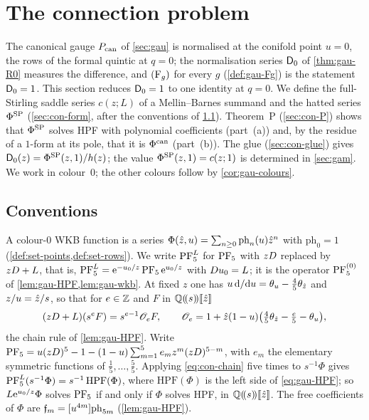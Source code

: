 
\section{The connection problem}
\label{sec:con}

The canonical gauge $P_{\mathrm{can}}$ of \cref{sec:gau} is normalised at the conifold point $u=0$, the rows of the formal quintic at $q=0$; the normalisation series $\mathsf{D}_0$ of \cref{thm:gau-R0} measures the difference, and $(\mathrm{F}_{g})$ for every $g$ (\cref{def:gau-Fg}) is the statement $\mathsf{D}_0=1$. This section reduces $\mathsf{D}_0=1$ to one identity at $q=0$. We define the full-Stirling saddle series $c(z;L)$ of a Mellin--Barnes summand and the hatted series $\Phi^{\mathrm{SP}}$ (\cref{sec:con-form}, after the conventions of \cref{sec:con-problem}). Theorem~P (\cref{sec:con-P}) shows that $\Phi^{\mathrm{SP}}$ solves HPF with polynomial coefficients (part~(a)) and, by the residue of a $1$-form at its pole, that it is $\Phi^{\mathrm{can}}$ (part~(b)). The glue (\cref{sec:con-glue}) gives $\mathsf{D}_0(z)=\Phi^{\mathrm{SP}}(z,1)/h(z)$; the value $\Phi^{\mathrm{SP}}(z,1)=c(z;1)$ is determined in \cref{sec:gam}. We work in colour~$0$; the other colours follow by \cref{cor:gau-colours}.

\subsection{Conventions}
\label{sec:con-problem}

A colour-$0$ WKB function is a series $\Phi(\hat{z},u)=\sum_{n\geq 0}\mathrm{ph}_n(u)\hat{z}^n$ with $\mathrm{ph}_0=1$ (\cref{def:set-points,def:set-rows}). We write $\mathrm{PF}_{5}^{L}$ for $\mathrm{PF}_{5}$ with $zD$ replaced by $zD+L$, that is, $\mathrm{PF}_{5}^{L}=\mathrm{e}^{-u_0/z}\,\mathrm{PF}_{5}\,\mathrm{e}^{u_0/z}$ with $D u_0=L$; it is the operator $\mathrm{PF}_{5}^{(0)}$ of \cref{lem:gau-HPF,lem:gau-wkb}. At fixed $z$ one has $u\,\mathrm{d}/\mathrm{d} u=\theta_u-\tfrac45\theta_{\hat{z}}$ and $z/u=\hat{z}/s$, so that for $e\in\mathbb{Z}$ and $F$ in $\mathbb{Q}(\!(s)\!)[\![ \hat{z} ]\!]$
\begin{equation}
\label{eq:con-chain}
(zD+L)(s^eF)=s^{e-1}\mathscr O_eF,\qquad \mathscr O_e=1+\hat{z}(1-u)\bigl(\tfrac45\theta_{\hat{z}}-\tfrac e5-\theta_u\bigr),
\end{equation}
the chain rule of \cref{lem:gau-HPF}. Write $\mathrm{PF}_{5}=u(zD)^5-1-(1-u)\sum_{m=1}^5e_mz^m(zD)^{5-m}$, with $e_m$ the elementary symmetric functions of $\tfrac15,\dots,\tfrac55$. Applying \eqref{eq:con-chain} five times to $s^{-1}\Phi$ gives $\mathrm{PF}_{5}^{L}(s^{-1}\Phi)=s^{-1}\,\mathrm{HPF}(\Phi)$, where $\mathrm{HPF}(\Phi)$ is the left side of \eqref{eq:gau-HPF}; so $L\mathrm{e}^{u_0/z}\Phi$ solves $\mathrm{PF}_{5}$ if and only if $\Phi$ solves HPF, in $\mathbb{Q}(\!(s)\!)[\![ \hat{z} ]\!]$. The free coefficients of $\Phi$ are $\mathfrak{f}_m=[u^{4m}]\mathrm{ph}_{5m}$ (\cref{lem:gau-HPF}).

